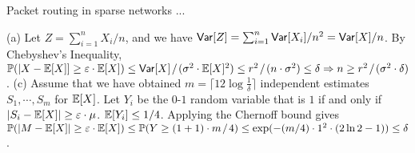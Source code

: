 \documentclass[main.tex]{subfiles}
\begin{document}
\bigskip

{\bs Packet routing in sparse networks} ...

\bigskip

 (a) Let $Z=\sum_{i=1}^{n} X_i / n$, and we have $\mathsf{Var}[Z] = \sum_{i=1}^{n}\mathsf{Var}[X_i] / n^2 = \mathsf{Var}[X] / n$. By Chebyshev’s Inequality, $\mathbb{P}(|X-\mathbb{E}[X]]\ge \varepsilon\cdot \mathbb{E}[X])\le \mathsf{Var}[X] \;\!/\;\! (\sigma^2\cdot\mathbb{E}[X]^2) \le r^2\;\!/\;\!(n\cdot\sigma^2) \le \delta \Rightarrow n \ge r^2\;\!/\;\!(\sigma^2\cdot\delta)$. (c) Assume that we have obtained $m=\lceil 12\log\frac{1}{\delta}\rceil$ independent estimates $S_1,\cdots,S_m$ for $\mathbb{E}[X]$. Let $Y_i$ be the $0$\;\!-$1$ random variable that is $1$ if and only if $|S_i-\mathbb{E}[X]|\ge\varepsilon\cdot\mu$. $\mathbb{E}[Y_i]\le 1/4$. Applying the Chernoff bound gives $\mathbb{P}(|M-\mathbb{E}[X]|\ge\varepsilon\cdot\mathbb{E}[X])\le\mathbb{P}(Y\ge(1+1)\cdot m \;\!/\;\! 4)\le\exp(-(m/4)\cdot 1^2\cdot(2\ln 2-1))\le\delta$.
\end{document}
